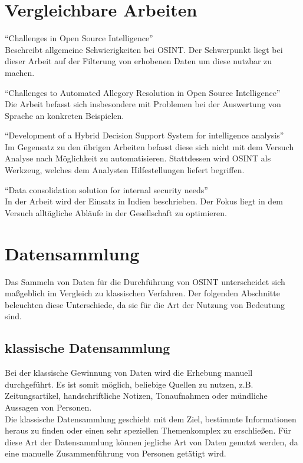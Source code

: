 \documentclass[twoside,a4paper]{article}
\begin{document}
\section{Vergleichbare Arbeiten}
\cite{challanges_in_osint}
\enquote{Challenges in Open Source Intelligence}\\
Beschreibt allgemeine Schwierigkeiten bei OSINT. Der Schwerpunkt liegt bei dieser Arbeit auf der Filterung von erhobenen Daten um diese nutzbar zu machen.\vspace{2mm}

\noindent\cite{challenges_to_automated_alloegory}
\enquote{Challenges to Automated Allegory Resolution in Open Source Intelligence}\\
Die Arbeit befasst sich insbesondere mit Problemen bei der Auswertung von Sprache an konkreten Beispielen.\vspace{2mm}

\noindent\cite{development_of_a_hybrid_decision_system}
\enquote{Development of a Hybrid Decision Support System for intelligence analysis}\\
Im Gegensatz zu den übrigen Arbeiten befasst diese sich nicht mit dem Versuch Analyse nach Möglichkeit zu automatisieren. Stattdessen wird OSINT als Werkzeug, welches dem Analysten Hilfestellungen liefert begriffen. \vspace{2mm}

\noindent\cite{data_consolidation_solution}
\enquote{Data consolidation solution for internal security needs}\\
In der Arbeit wird der Einsatz in Indien beschrieben. Der Fokus liegt in dem Versuch alltägliche Abläufe in der Gesellschaft zu optimieren.


\section{Datensammlung}
Das Sammeln von Daten für die Durchführung von OSINT unterscheidet sich maßgeblich im Vergleich zu klassischen Verfahren. Der folgenden Abschnitte beleuchten diese Unterschiede, da sie für die Art der Nutzung von Bedeutung sind.

\subsection{klassische Datensammlung}
Bei der klassische Gewinnung von Daten wird die Erhebung manuell durchgeführt. Es ist somit möglich, beliebige Quellen zu nutzen, z.B. Zeitungsartikel, handschriftliche Notizen, Tonaufnahmen oder mündliche Aussagen von Personen.\\
Die klassische Datensammlung geschieht mit dem Ziel, bestimmte Informationen heraus zu finden oder einen sehr speziellen Themenkomplex zu erschließen. Für diese Art der Datensammlung können jegliche Art von Daten genutzt werden, da eine manuelle Zusammenführung von Personen getätigt wird.
\end{document}
